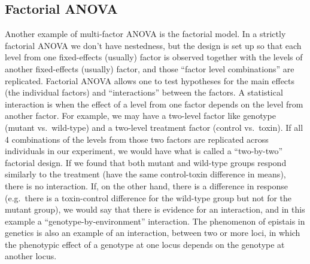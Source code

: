 \documentclass[]{book}
\newenvironment{Shaded}{\begin{snugshade}}{\end{snugshade}}
\newcommand{\CommentTok}[1]{\textcolor[rgb]{0.56,0.35,0.01}{\textit{#1}}}
\newcommand{\DataTypeTok}[1]{\textcolor[rgb]{0.13,0.29,0.53}{#1}}
\newcommand{\DecValTok}[1]{\textcolor[rgb]{0.00,0.00,0.81}{#1}}
\newcommand{\KeywordTok}[1]{\textcolor[rgb]{0.13,0.29,0.53}{\textbf{#1}}}
\newcommand{\NormalTok}[1]{#1}
\newcommand{\OperatorTok}[1]{\textcolor[rgb]{0.81,0.36,0.00}{\textbf{#1}}}
\newcommand{\StringTok}[1]{\textcolor[rgb]{0.31,0.60,0.02}{#1}}
\begin{document}
\begin{Shaded}
\end{Shaded}

\hypertarget{factorial-anova}{%
\subsection{Factorial ANOVA}\label{factorial-anova}}

Another example of multi-factor ANOVA is the factorial model. In a strictly factorial ANOVA we don't have nestedness, but the design is set up so that each level from one fixed-effects (usually) factor is observed together with the levels of another fixed-effects (usually) factor, and those ``factor level combinations'' are replicated. Factorial ANOVA allows one to test hypotheses for the main effects (the individual factors) and ``interactions'' between the factors. A statistical interaction is when the effect of a level from one factor depends on the level from another factor. For example, we may have a two-level factor like genotype (mutant vs.~wild-type) and a two-level treatment factor (control vs.~toxin). If all 4 combinations of the levels from those two factors are replicated across individuals in our experiment, we would have what is called a ``two-by-two'' factorial design. If we found that both mutant and wild-type groups respond similarly to the treatment (have the same control-toxin difference in means), there is no interaction. If, on the other hand, there is a difference in response (e.g.~there is a toxin-control difference for the wild-type group but not for the mutant group), we would say that there is evidence for an interaction, and in this example a ``genotype-by-environment'' interaction. The phenomenon of epistais in genetics is also an example of an interaction, between two or more loci, in which the phenotypic effect of a genotype at one locus depends on the genotype at another locus.
\end{document}
